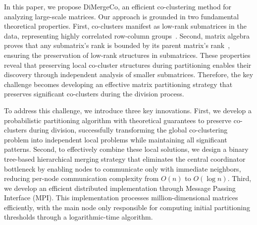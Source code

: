 \documentclass[journal]{IEEEtran}
\theoremstyle{definition}
\theoremstyle{remark} %
\renewcommand{\cite}[1]{~\autocite{#1}}
\begin{document}
In this paper, we propose DiMergeCo, an efficient co-clustering method for analyzing large-scale matrices. Our approach is grounded in two fundamental theoretical properties. First, co-clusters manifest as low-rank submatrices in the data, representing highly correlated row-column groups\cite{zhao2016IdentifyingMultidimensionalCoclusters,wu2024ScalableCoClusteringLargeScale}. Second, matrix algebra proves that any submatrix's rank is bounded by its parent matrix's rank\cite{horn1985MatrixAnalysis}, ensuring the preservation of low-rank structures in submatrices. These properties reveal that preserving local co-cluster structures during partitioning enables their discovery through independent analysis of smaller submatrices. Therefore, the key challenge becomes developing an effective matrix partitioning strategy that preserves significant co-clusters during the division process.

To address this challenge, we introduce three key innovations. First, we develop a probabilistic partitioning algorithm with theoretical guarantees to preserve co-clusters during division, successfully transforming the global co-clustering problem into independent local problems while maintaining all significant patterns. Second, to effectively combine these local solutions, we design a binary tree-based hierarchical merging strategy that eliminates the central coordinator bottleneck by enabling nodes to communicate only with immediate neighbors, reducing per-node communication complexity from $O(n)$ to $O(\log n)$. Third, we develop an efficient distributed implementation through Message Passing Interface (MPI). This implementation processes million-dimensional matrices efficiently, with the main node only responsible for computing initial partitioning thresholds through a logarithmic-time algorithm.
\end{document}
